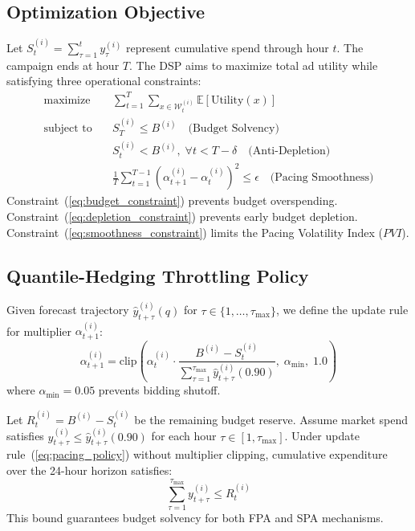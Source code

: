 \documentclass[sigconf]{acmart}
\begin{document}
\subsection{Optimization Objective}
Let $S_t^{(i)} = \sum_{\tau=1}^t y_\tau^{(i)}$ represent cumulative spend through hour $t$. The campaign ends at hour $T$. The DSP aims to maximize total ad utility while satisfying three operational constraints:
\begin{align}
    \text{maximize} \quad & \sum_{t=1}^T \sum_{x \in \mathcal{W}_t^{(i)}} \mathbb{E}[\text{Utility}(x)] \\
    \text{subject to} \quad & S_T^{(i)} \le B^{(i)} \quad \text{(Budget Solvency)} \label{eq:budget_constraint} \\
    & S_t^{(i)} < B^{(i)}, \; \forall t < T - \delta \quad \text{(Anti-Depletion)} \label{eq:depletion_constraint} \\
    & \frac{1}{T}\sum_{t=1}^{T-1} (\alpha_{t+1}^{(i)} - \alpha_t^{(i)})^2 \le \epsilon \quad \text{(Pacing Smoothness)} \label{eq:smoothness_constraint}
\end{align}
Constraint~(\ref{eq:budget_constraint}) prevents budget overspending. Constraint~(\ref{eq:depletion_constraint}) prevents early budget depletion. Constraint~(\ref{eq:smoothness_constraint}) limits the Pacing Volatility Index ($PVI$).

\subsection{Quantile-Hedging Throttling Policy}
Given forecast trajectory $\hat{y}_{t+\tau}^{(i)}(q)$ for $\tau \in \{1, \dots, \tau_{\max}\}$, we define the update rule for multiplier $\alpha_{t+1}^{(i)}$:
\begin{equation}
    \alpha_{t+1}^{(i)} = \text{clip}\left(\alpha_t^{(i)} \cdot \frac{B^{(i)} - S_t^{(i)}}{\sum_{\tau=1}^{\tau_{\max}} \hat{y}_{t+\tau}^{(i)}(0.90)}, \; \alpha_{\min}, \; 1.0\right)
    \label{eq:pacing_policy}
\end{equation}
where $\alpha_{\min} = 0.05$ prevents bidding shutoff.

\begin{lemma}
Let $R_t^{(i)} = B^{(i)} - S_t^{(i)}$ be the remaining budget reserve. Assume market spend satisfies $y_{t+\tau}^{(i)} \le \hat{y}_{t+\tau}^{(i)}(0.90)$ for each hour $\tau \in [1, \tau_{\max}]$. Under update rule~(\ref{eq:pacing_policy}) without multiplier clipping, cumulative expenditure over the 24-hour horizon satisfies:
\begin{equation}
    \sum_{\tau=1}^{\tau_{\max}} y_{t+\tau}^{(i)} \le R_t^{(i)}
\end{equation}
This bound guarantees budget solvency for both FPA and SPA mechanisms.
\end{lemma}
\end{document}
